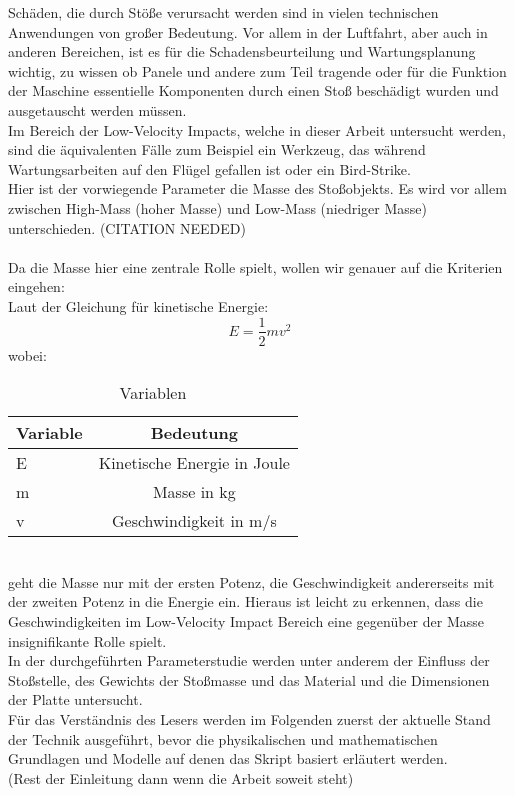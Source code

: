 Schäden, die durch Stöße verursacht werden sind in vielen technischen Anwendungen von großer Bedeutung. Vor allem in der Luftfahrt, aber auch in anderen Bereichen, ist es für die Schadensbeurteilung und Wartungsplanung wichtig, zu wissen ob Panele und andere zum Teil tragende oder für die Funktion der Maschine essentielle Komponenten durch einen Stoß beschädigt wurden und ausgetauscht werden müssen. \\
Im Bereich der Low-Velocity Impacts, welche in dieser Arbeit untersucht werden, sind die äquivalenten Fälle zum Beispiel ein Werkzeug, das während Wartungsarbeiten auf den Flügel gefallen ist oder ein Bird-Strike. \\
Hier ist der vorwiegende Parameter die Masse des Stoßobjekts. Es wird vor allem zwischen High-Mass (hoher Masse) und Low-Mass (niedriger Masse) unterschieden. (CITATION NEEDED)\\
\\
Da die Masse hier eine zentrale Rolle spielt, wollen wir genauer auf die Kriterien eingehen: \\
Laut der Gleichung für kinetische Energie: 
\begin{equation}
E = \frac{1}{2}mv^2
\end{equation}
wobei: 
\begin{table}[h!]
	\begin{center}
		\caption{Variablen}
		\label{tab:Tabelle 1}
		\begin{tabular}{l|c}
			\textbf{Variable} & \textbf{Bedeutung}\\
			\hline
			E & Kinetische Energie in Joule\\
			m & Masse in kg\\
			v & Geschwindigkeit in m/s\\
		\end{tabular}
	\end{center}
\end{table}\\
geht die Masse nur mit der ersten Potenz, die Geschwindigkeit andererseits mit der zweiten Potenz in die Energie ein. Hieraus ist leicht zu erkennen, dass die Geschwindigkeiten im Low-Velocity Impact Bereich eine gegenüber der Masse insignifikante Rolle spielt. \\
In der durchgeführten Parameterstudie werden unter anderem der Einfluss der Stoßstelle, des Gewichts der Stoßmasse und das Material und die Dimensionen der Platte untersucht. \\
Für das Verständnis des Lesers werden im Folgenden zuerst der aktuelle Stand der Technik ausgeführt, bevor die physikalischen und mathematischen Grundlagen und Modelle auf denen das Skript basiert erläutert werden.\\
(Rest der Einleitung dann wenn die Arbeit soweit steht)
\\
